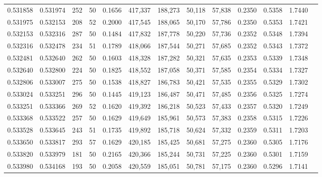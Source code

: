 \begin{tabular}{rrrrrrrrrrrrr}
0.531858 & 0.531974 &   252 &  50 &                                     0.1656 & 417,337 & 188,273 &  50,118 &  57,838 & 0.2350 & 0.5358 & 1.7440 \\
0.531975 & 0.532153 &   208 &  52 &                                     0.2000 & 417,545 & 188,065 &  50,170 &  57,786 & 0.2350 & 0.5353 & 1.7421 \\
0.532153 & 0.532316 &   287 &  50 &                                     0.1484 & 417,832 & 187,778 &  50,220 &  57,736 & 0.2352 & 0.5348 & 1.7394 \\
0.532316 & 0.532478 &   234 &  51 &                                     0.1789 & 418,066 & 187,544 &  50,271 &  57,685 & 0.2352 & 0.5343 & 1.7372 \\
0.532481 & 0.532640 &   262 &  50 &                                     0.1603 & 418,328 & 187,282 &  50,321 &  57,635 & 0.2353 & 0.5339 & 1.7348 \\
0.532640 & 0.532800 &   224 &  50 &                                     0.1825 & 418,552 & 187,058 &  50,371 &  57,585 & 0.2354 & 0.5334 & 1.7327 \\
0.532806 & 0.533007 &   275 &  50 &                                     0.1538 & 418,827 & 186,783 &  50,421 &  57,535 & 0.2355 & 0.5329 & 1.7302 \\
0.533024 & 0.533251 &   296 &  50 &                                     0.1445 & 419,123 & 186,487 &  50,471 &  57,485 & 0.2356 & 0.5325 & 1.7274 \\
0.533251 & 0.533366 &   269 &  52 &                                     0.1620 & 419,392 & 186,218 &  50,523 &  57,433 & 0.2357 & 0.5320 & 1.7249 \\
0.533368 & 0.533522 &   257 &  50 &                                     0.1629 & 419,649 & 185,961 &  50,573 &  57,383 & 0.2358 & 0.5315 & 1.7226 \\
0.533528 & 0.533645 &   243 &  51 &                                     0.1735 & 419,892 & 185,718 &  50,624 &  57,332 & 0.2359 & 0.5311 & 1.7203 \\
0.533650 & 0.533817 &   293 &  57 &                                     0.1629 & 420,185 & 185,425 &  50,681 &  57,275 & 0.2360 & 0.5305 & 1.7176 \\
0.533820 & 0.533979 &   181 &  50 &                                     0.2165 & 420,366 & 185,244 &  50,731 &  57,225 & 0.2360 & 0.5301 & 1.7159 \\
0.533980 & 0.534168 &   193 &  50 &                                     0.2058 & 420,559 & 185,051 &  50,781 &  57,175 & 0.2360 & 0.5296 & 1.7141 \\

\end{tabular}
